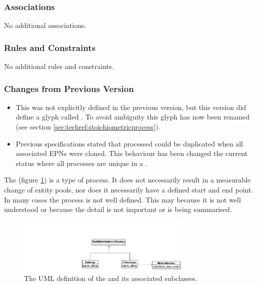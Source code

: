 \subsubsection{Associations}

No additional associations.

\subsubsection{Rules and Constraints}

No additional rules and constraints.

\subsubsection{Changes from Previous Version}
\begin{itemize}
\item This was not explicitly defined in the previous version, but
  this version did define a glyph called . To avoid
  ambiguity this glyph has now been renamed  (see section \ref{sec:techref:stoichiometricprocess}).
\item Previous specifications stated that processed could be
  duplicated when all associated EPNs were cloned. This behaviour has
  been changed the current status where all processes are unique in a \PDm.
\end{itemize}

\label{defn:NonStoichiometricProcess}

The  (figure \ref{fig:techref:nonstoichprocessuml})
is a type of process. It does not necessarily result in a measurable
change of entity pools, nor does it necessarily have a defined start
and end point. In many cases the process is not well defined. This may
because it is not well understood or because the detail is not
important or is being summarised.

\begin{figure}[htb]
  \centering
  \includegraphics[width = 0.75\textwidth]{images/nonstoichprocessuml}
  \caption{The UML definition of the  and its
    associated subclasses.}
  \label{fig:techref:nonstoichprocessuml}
\end{figure}

